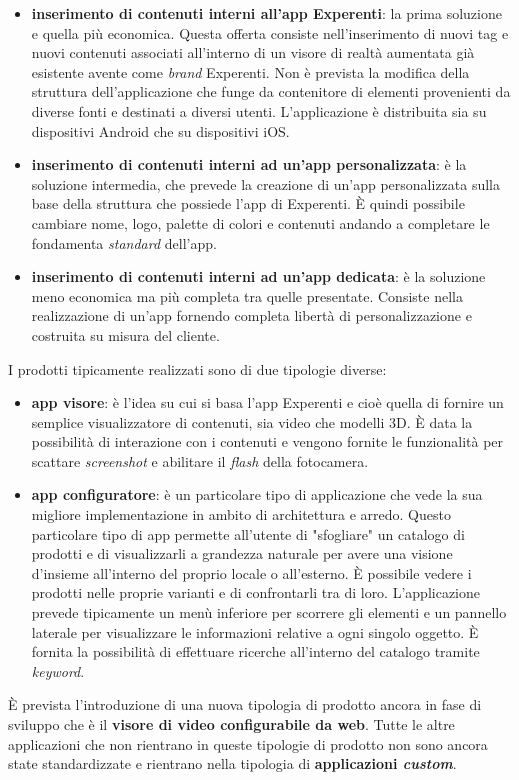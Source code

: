 \begin{itemize}
	\item \textbf{inserimento di contenuti interni all'app Experenti}: la prima soluzione e quella pi\`u economica. Questa offerta consiste nell'inserimento di nuovi tag e nuovi contenuti associati all'interno di un visore di realt\`a aumentata gi\`a esistente avente come \textit{brand} Experenti. Non \`e prevista la modifica della struttura dell'applicazione che funge da contenitore di elementi provenienti da diverse fonti e destinati a diversi utenti. L'applicazione \`e distribuita sia su dispositivi Android che su dispositivi iOS.
	
	\item \textbf{inserimento di contenuti interni ad un'app personalizzata}: \`e la soluzione intermedia, che prevede la creazione di un'app personalizzata sulla base della struttura che possiede l'app di Experenti. \`E quindi possibile cambiare nome, logo, palette di colori e contenuti andando a completare le fondamenta \textit{standard} dell'app.
	
	\item \textbf{inserimento di contenuti interni ad un'app dedicata}: \`e la soluzione meno economica ma pi\`u completa tra quelle presentate. Consiste nella realizzazione di un'app fornendo completa libert\`a di personalizzazione e costruita su misura del cliente.
\end{itemize}
\noindent
I prodotti tipicamente realizzati sono di due tipologie diverse:
\begin{itemize}
	\item \textbf{app visore}: \`e l'idea su cui si basa l'app Experenti e cio\`e quella di fornire un semplice visualizzatore di contenuti, sia video che modelli 3D. \`E data la possibilit\`a di interazione con i contenuti e vengono fornite le funzionalit\`a per scattare \textit{screenshot} e abilitare il \textit{flash} della fotocamera.
	
	\item \textbf{app configuratore}: \`e un particolare tipo di applicazione che vede la sua migliore implementazione in ambito di architettura e arredo. Questo particolare tipo di app permette all'utente di "sfogliare" un catalogo di prodotti e di visualizzarli a grandezza naturale per avere una visione d'insieme all'interno del proprio locale o all'esterno. \`E possibile vedere i prodotti nelle proprie varianti e di confrontarli tra di loro. L'applicazione prevede tipicamente un men\`u inferiore per scorrere gli elementi e un pannello laterale per visualizzare le informazioni relative a ogni singolo oggetto. \`E fornita la possibilit\`a di effettuare ricerche all'interno del catalogo tramite \textit{keyword}.
\end{itemize}
\noindent
\`E prevista l'introduzione di una nuova tipologia di prodotto ancora in fase di sviluppo che \`e il \textbf{visore di video configurabile da web}. Tutte le altre applicazioni che non rientrano in queste tipologie di prodotto non sono ancora state standardizzate e rientrano nella tipologia di \textbf{applicazioni \textit{custom}}. 

